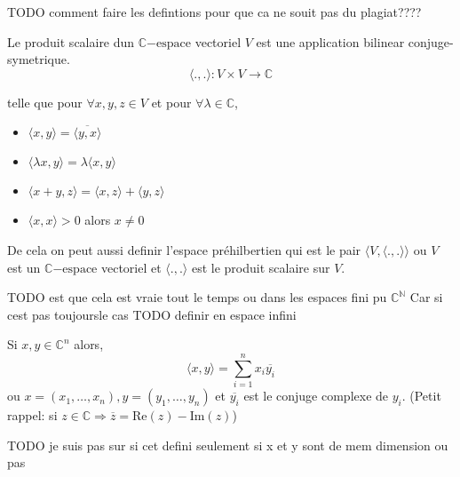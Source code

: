 TODO comment faire les defintions pour que ca ne souit pas du plagiat????
\begin{definition}[$l^2$]
    
\end{definition}

\begin{definition}
    Le produit scalaire dun $\mathbb{C}\mathrm{-espace}$ vectoriel $V$ est une application bilinear conjuge-symetrique. $$\langle ., . \rangle : V \times V \rightarrow \mathbb{C}$$

    telle que pour $ \forall x, y, z\in V$ et pour $\forall \lambda \in \mathbb{C}$,
    \begin{itemize}
        \item $\langle x, y \rangle = \overline{\langle y,x \rangle}$
        \item $\langle \lambda x, y \rangle = \lambda\langle x,y \rangle$
        \item $\langle x+y, z \rangle = \langle x,z \rangle + \langle y,z \rangle$
        \item $\langle x,x \rangle > 0 $ alors $x \neq 0 $
    \end{itemize}
    
    De cela on peut aussi definir l'espace préhilbertien qui est le pair $\langle V, \langle.,.\rangle \rangle$ ou $V$ est un $\mathbb{C}\mathrm{-espace}$ vectoriel et $\langle.,.\rangle$ est le produit scalaire sur $V$.
\end{definition}

TODO est que cela est vraie tout le temps ou dans les espaces fini pu $\mathbb{C}^\mathbb{N}$ Car si cest pas toujoursle cas TODO definir en espace infini

Si $x, y \in \mathbb{C}^n $ alors,
$$\langle x,y \rangle = \sum_{i=1}^{n} x_i \overline{y_i}$$
ou $x = (x_1, \ldots, x_n), y = (y_1, \ldots, y_n)$ et $\overline{y_i}$ est le conjuge complexe de $y_i$.  \newline (Petit rappel: si $z \in \mathbb{C} \Rightarrow \overline{z} = \mathrm{Re}(z) - \mathrm{Im}(z) $)

TODO je suis pas sur si cet defini seulement si x et y sont de mem dimension ou pas 
\begin{definition}
    
\end{definition}



\begin{definition}

\end{definition}